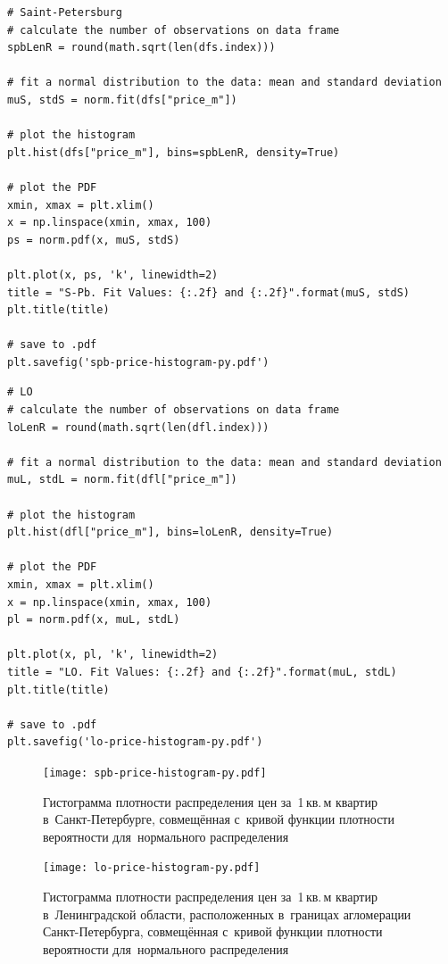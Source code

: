 \documentclass[]{scrreprt}
\begin{document}
%
\begin{lstlisting}[float, caption = Построение гистограммы для~Санкт-Петербурга, firstnumber=1, label= lst:price-hist-spb]
# Saint-Petersburg
# calculate the number of observations on data frame
spbLenR = round(math.sqrt(len(dfs.index)))

# fit a normal distribution to the data: mean and standard deviation
muS, stdS = norm.fit(dfs["price_m"])

# plot the histogram
plt.hist(dfs["price_m"], bins=spbLenR, density=True)

# plot the PDF
xmin, xmax = plt.xlim()
x = np.linspace(xmin, xmax, 100)
ps = norm.pdf(x, muS, stdS)

plt.plot(x, ps, 'k', linewidth=2)
title = "S-Pb. Fit Values: {:.2f} and {:.2f}".format(muS, stdS)
plt.title(title)

# save to .pdf
plt.savefig('spb-price-histogram-py.pdf')
\end{lstlisting}
%
\begin{lstlisting}[float, caption = Построение гистограммы для~Ленингадской области, firstnumber=1, label= lst:price-hist-lo]
# LO
# calculate the number of observations on data frame
loLenR = round(math.sqrt(len(dfl.index)))

# fit a normal distribution to the data: mean and standard deviation
muL, stdL = norm.fit(dfl["price_m"])

# plot the histogram
plt.hist(dfl["price_m"], bins=loLenR, density=True)

# plot the PDF
xmin, xmax = plt.xlim()
x = np.linspace(xmin, xmax, 100)
pl = norm.pdf(x, muL, stdL)

plt.plot(x, pl, 'k', linewidth=2)
title = "LO. Fit Values: {:.2f} and {:.2f}".format(muL, stdL)
plt.title(title)

# save to .pdf
plt.savefig('lo-price-histogram-py.pdf')
\end{lstlisting} 
%
\begin{figure}[ht]
	\centering
	\texttt{[image: spb-price-histogram-py.pdf]}
	\caption{Гистограмма плотности распределения цен за~1\,кв.\,м квартир в~Санкт-Петербурге, совмещённая с~кривой функции плотности вероятности для~нормального распределения}
	\label{fig:spb-prices-hist}
\end{figure}
%
\begin{figure}[ht]
	\centering
	\texttt{[image: lo-price-histogram-py.pdf]}
	\caption{Гистограмма плотности распределения цен за~1\,кв.\,м квартир в~Ленинградской области, расположенных в~границах агломерации Санкт-Петербурга, совмещённая с~кривой функции плотности вероятности для~нормального распределения}
	\label{fig:lo-prices-hist}
\end{figure}
%
\end{document}
